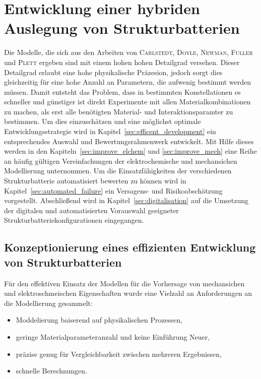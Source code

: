 \chapter{Entwicklung einer hybriden Auslegung von Strukturbatterien}
Die Modelle, die sich aus den Arbeiten von \textsc{Carlstedt}, \textsc{Doyle}, \textsc{Newman}, \textsc{Fuller} und \textsc{Plett} ergeben sind mit einem hohen hohen Detailgrad versehen. Dieser Detailgrad erlaubt eine hohe physikalische Präzesion, jedoch sorgt dies gleichzeitig für eine hohe Anzahl an Parametern, die aufwenig bestimmt werden müssen. Damit entsteht das Problem, dass in bestimmten Konstellationen es schneller und günstiger ist direkt Experimente mit allen Materialkombinationen zu machen, als erst alle benötigten Material- und Interaktionsparamter zu bestimmen. Um dies einzuschätzen und eine möglichst optimale Entwicklungsstrategie wird in Kapitel~\ref{sec:efficent_development} ein entsprechendes Auswahl und Bewertungsrahmenwerk entwickelt. Mit Hilfe dieses werden in den Kapiteln~\ref{sec:improve_elchem} und \ref{sec:improve_mech} eine Reihe an häufig gültigen Vereinfachungen der elektrochemische und mechansichen Modellierung unternommen. Um die Einsatzfähigkeiten der verschiedenen Strukturbatterie automatisiert bewerten zu können wird in Kapitel~\ref{sec:automated_failure} ein Versagens- und Risikoabschätzung vorgestellt. Abschließend wird in Kapitel~\ref{sec:digitalisation} auf die Umsetzung der digitalen und automatisierten Vorauswahl geeigneter Strukturbatteriekonfigurationen eingegangen.

\section{\label{sec:efficent_development}Konzeptionierung eines effizienten Entwicklung von Strukturbatterien}
Für den effektiven Einsatz der Modellen für die Vorhersage von mechansichen und elektroschmeischen Eigenschaften wurde eine Vielzahl an Anforderungen an die Modellierung gesammelt:
\begin{itemize}
    \item Moddelierung baiserend auf physikalischen Prozessen, %
    \item geringe Materialparameteranzahl und keine Einführung Neuer, %
    \item präzise genug für Vergleichbarkeit zwischen mehreren Ergebnissen, %
    \item schnelle Berechnungen. %
\end{itemize} 

